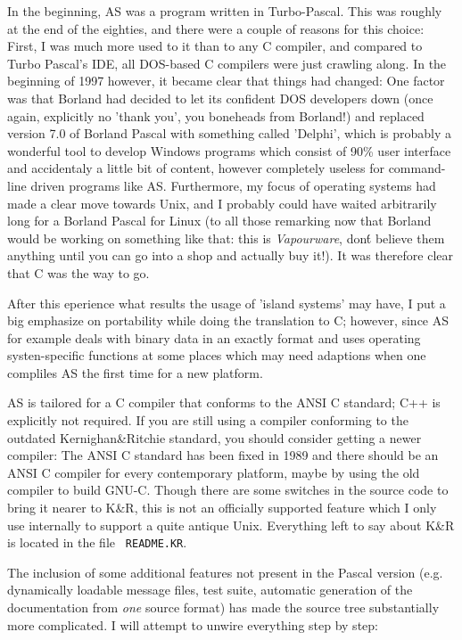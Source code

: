\documentclass[12pt,twoside]{report}
\newcommand{\asname}{{AS}}
\begin{document}
In the beginning, \asname{} was a program written in Turbo-Pascal.  This was
roughly at the end of the eighties, and there were a couple of reasons for
this choice: First, I was much more used to it than to any C compiler, and
compared to Turbo Pascal's IDE, all DOS-based C compilers were just
crawling along.  In the beginning of 1997 however, it became clear that
things had changed: One factor was that Borland had decided to let its
confident DOS developers down (once again, explicitly no 'thank you', you
boneheads from Borland!) and replaced version 7.0 of Borland Pascal with
something called 'Delphi', which is probably a wonderful tool to develop
Windows programs which consist of 90\% user interface and accidentaly a
little bit of content, however completely useless for command-line driven
programs like \asname{}.  Furthermore, my focus of operating systems had made a
clear move towards Unix, and I probably could have waited arbitrarily long
for a Borland Pascal for Linux (to all those remarking now that Borland
would be working on something like that: this is {\em Vapourware}, don\'t
believe them anything until you can go into a shop and actually buy it!).
It was therefore clear that C was the way to go.

After this eperience what results the usage of 'island systems' may have,
I put a big emphasize on portability while doing the translation to C;
however, since \asname{} for example deals with binary data in an exactly format
and uses operating systen-specific functions at some places which may need
adaptions when one compliles \asname{} the first time for a new platform.

\asname{} is tailored for a C compiler that conforms to the ANSI C standard; C++
is explicitly not required.  If you are still using a compiler conforming
to the outdated Kernighan\&Ritchie standard, you should consider getting a
newer compiler: The ANSI C standard has been fixed in 1989 and there
should be an ANSI C compiler for every contemporary platform, maybe by
using the old compiler to build GNU-C.  Though there are some switches in
the source code to bring it nearer to K\&R, this is not an officially
supported feature which I only use internally to support a quite antique
Unix.  Everything left to say about K\&R is located in the file {\tt
README.KR}.

The inclusion of some additional features not present in the Pascal
version (e.g. dynamically loadable message files, test suite, automatic
generation of the documentation from {\em one} source format) has made the
source tree substantially more complicated.  I will attempt to unwire
everything step by step:
\end{document}
